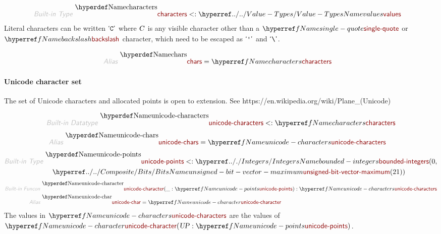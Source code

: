 \begin{align*}
  \KEY{Built-in Type} ~  
  & \NAMEDECL{characters} <: \NAMEHYPER{../..}{Value-Types}{values}
\end{align*}
Literal characters can be written $\strut\textsf{`\texttt{C}'}\strut$ where $\SHADE{\VAR{C}}$ is any visible character
  other than a $\SHADE{\NAMEREF{single-quote}}$ or $\SHADE{\NAMEREF{backslash}}$ character, which need to be
  escaped as $\SHADE{\ATOM{\APOSTROPHE }}$ and $\SHADE{\ATOM{\BACKSLASH }}$.

\begin{align*}
  \KEY{Alias} ~ 
  & \NAMEDECL{chars} = \NAMEREF{characters}
\end{align*}
\paragraph*{Unicode character set}\hypertarget{unicode-character-set}{}\label{unicode-character-set}

The set of Unicode characters and allocated points is open to extension.
  See https://en.wikipedia.org/wiki/Plane\_(Unicode)

\begin{align*}
  \KEY{Built-in Datatype} ~ 
  \NAMEDECL{unicode-characters} <: \NAMEREF{characters}
\end{align*}
\begin{align*}
  \KEY{Alias} ~ 
  & \NAMEDECL{unicode-chars} = \NAMEREF{unicode-characters}
\end{align*}
\begin{align*}
  \KEY{Built-in Type} ~  
  & \NAMEDECL{unicode-points} <: \NAMEHYPER{../.}{Integers}{bounded-integers}
                                                             ( 0, \\&\quad 
                                                               \NAMEHYPER{../../Composite}{Bits}{unsigned-bit-vector-maximum}
                                                                 ( 21 ) )
\end{align*}
\begin{align*}
  \KEY{Built-in Funcon} ~ 
  & \NAMEDECL{unicode-character}(\_ : \NAMEREF{unicode-points}) : \NAMEREF{unicode-characters}
\\
  \KEY{Alias} ~ 
  & \NAMEDECL{unicode-char} = \NAMEREF{unicode-character}
\end{align*}
The values in $\SHADE{\NAMEREF{unicode-characters}}$ are the values of
  $\SHADE{\NAMEREF{unicode-character}
           ( \VAR{UP} : \NAMEREF{unicode-points} )}$.


